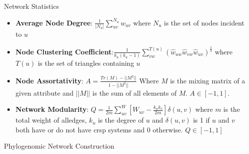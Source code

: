 \documentclass[dvipsnames]{beamer}
\begin{document}
\begin{frame}[fragile]{Network Statistics}
    \begin{itemize}
        \item \textbf{Average Node Degree}: $\frac{1}{|N_u|}\sum_{uv}^{N_u} w_{uv}$ where $N_u$ is the set of nodes incident to $u$
        \item \textbf{Node Clustering Coefficient}:$\frac{1}{k_u(k_u-1)} \sum_{vw}^{T(u)} (\hat{w}_{uw} \hat{w}_{vw} \hat{w}_{uv})^{\frac{1}{3}}$ where $T(u)$ is the set of triangles containing $u$ \autocite{clustering}
        \item \textbf{Node Assortativity}: $A = \frac{Tr(M)-||M^2||}{1-||M^2||}$ Where $M$ is the mixing matrix of a given attribute and $||M||$ is the sum of all elements of $M$. $A \in [-1,1]$. \autocite{newmanmix}
        \item \textbf{Network Modularity}: $Q=\frac{1}{2m}\sum_{uv}^W [W_{uv} - \frac{k_u k_v}{2m}]\delta(u,v)$ where $m$ is the total weight of alledges, $k_u$ is the degree of $u$ and $\delta(u,v)$ is 1 if $u$ and $v$ both have or do not have \ac{crsp} systems and 0 otherwise. $Q \in [-1,1]$ \autocite{modularity}
    \end{itemize}
\end{frame}
\begin{frame}[fragile]{Phylogenomic Network Construction}
    \begin{figure}[htb!]
        \autocite{ihgt}
    \end{figure}
\end{frame}
\end{document}
